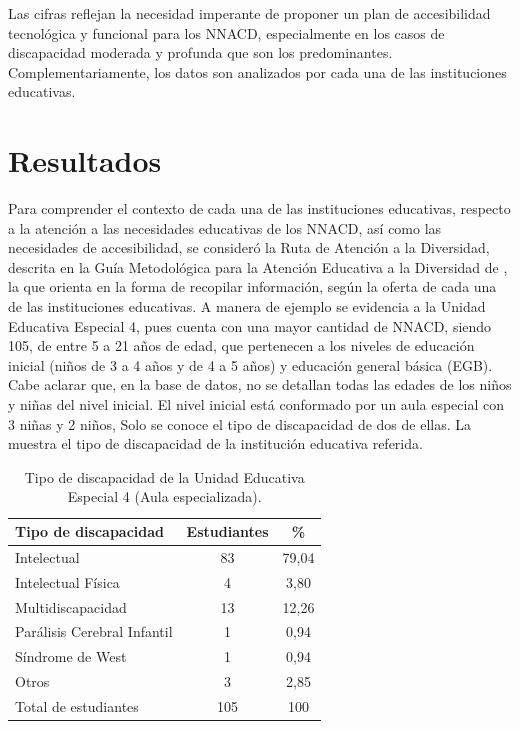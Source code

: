 \documentclass[spanish]{textolivre}
\begin{document}
Las cifras reflejan la necesidad imperante de proponer un plan de accesibilidad tecnológica y funcional para los NNACD, especialmente en los casos de discapacidad moderada y profunda que son los predominantes. Complementariamente, los datos son analizados por cada una de las instituciones educativas.

\section{Resultados}\label{sec-conduta}
Para comprender el contexto de cada una de las instituciones educativas, respecto a la atención a las necesidades educativas de los NNACD, así como las necesidades de accesibilidad, se consideró la Ruta de Atención a la Diversidad, descrita en la Guía Metodológica para la Atención Educativa a la Diversidad de \textcite{fe_y_alegria_guimetodologica_2020}, la que orienta en la forma de recopilar información, según la oferta de cada una de las instituciones educativas. A manera de ejemplo se evidencia a la Unidad Educativa Especial 4, pues cuenta con una mayor cantidad de NNACD, siendo 105, de entre 5 a 21 años de edad, que pertenecen a los niveles de educación inicial (niños de 3 a 4 años y de 4 a 5 años) y educación general básica (EGB). Cabe aclarar que, en la base de datos, no se detallan todas las edades de los niños y niñas del nivel inicial. El nivel inicial está conformado por un aula especial con 3 niñas y 2 niños, Solo se conoce el tipo de discapacidad de dos de ellas. La  muestra el tipo de discapacidad de la institución educativa referida. 

\begin{table}[h!]
\centering
\begin{threeparttable}
\caption{Tipo de discapacidad de la Unidad Educativa Especial 4 (Aula especializada).}
\label{tab01}
\centering
\begin{tabular}{l S S[table-format=3.2]}
\toprule
Tipo de discapacidad & {Estudiantes} & {\si{\percent}} \\
\midrule
Intelectual & 83 & 79,04  \\
Intelectual Física & 4 & 3,80   \\
Multidiscapacidad & 13 & 12,26  \\
Parálisis Cerebral Infantil & 1 & 0,94  \\
Síndrome de West & 1 & 0,94  \\
Otros & 3 & 2,85 \\
Total de estudiantes & 105 & 100  \\
\bottomrule
\end{tabular}
\end{threeparttable}
\end{table}
\end{document}
